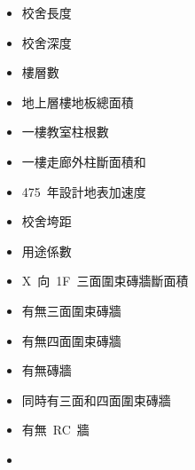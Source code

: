 \begin{multicols}{2}
\begin{itemize}
\item 校舍長度
\item 校舍深度
\item 樓層數
\item 地上層樓地板總面積
\item 一樓教室柱根數
\item 一樓走廊外柱斷面積和
\item 475~年設計地表加速度
\item 校舍垮距
\item 用途係數
\item X~向~1F~三面圍束磚牆斷面積
\item 有無三面圍束磚牆
\item 有無四面圍束磚牆
\item 有無磚牆
\item 同時有三面和四面圍束磚牆
\item 有無~RC~牆
\item[]
\end{itemize}
\end{multicols}

